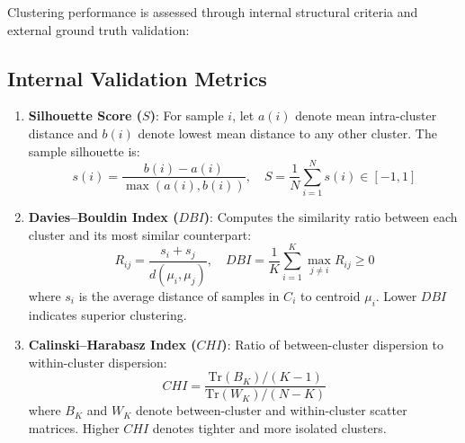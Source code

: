 \documentclass[12pt,a4paper]{article}
\begin{document}
Clustering performance is assessed through internal structural criteria and external ground truth validation:

\subsection{Internal Validation Metrics}
\begin{enumerate}
\item \textbf{Silhouette Score ($S$)}: For sample $i$, let $a(i)$ denote mean intra-cluster distance and $b(i)$ denote lowest mean distance to any other cluster. The sample silhouette is:
\begin{equation}
s(i) = \frac{b(i) - a(i)}{\max(a(i), b(i))}, \quad S = \frac{1}{N}\sum_{i=1}^N s(i) \in [-1, 1]
\end{equation}
\item \textbf{Davies--Bouldin Index ($DBI$)}: Computes the similarity ratio between each cluster and its most similar counterpart:
\begin{equation}
R_{ij} = \frac{s_i + s_j}{d(\mu_i, \mu_j)}, \quad DBI = \frac{1}{K}\sum_{i=1}^K \max_{j \ne i} R_{ij} \ge 0
\end{equation}
where $s_i$ is the average distance of samples in $C_i$ to centroid $\mu_i$. Lower $DBI$ indicates superior clustering.
\item \textbf{Calinski--Harabasz Index ($CHI$)}: Ratio of between-cluster dispersion to within-cluster dispersion:
\begin{equation}
CHI = \frac{\text{Tr}(B_K) / (K - 1)}{\text{Tr}(W_K) / (N - K)}
\end{equation}
where $B_K$ and $W_K$ denote between-cluster and within-cluster scatter matrices. Higher $CHI$ denotes tighter and more isolated clusters.
\end{enumerate}
\end{document}
